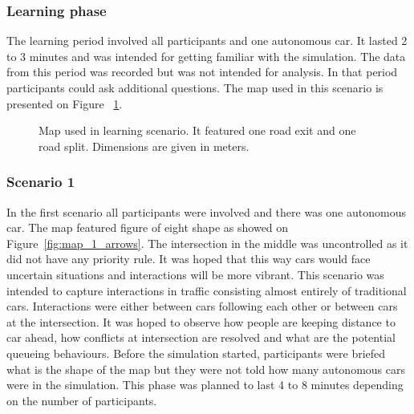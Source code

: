 \documentclass[11pt,english]{article}
\begin{document}
\subsubsection{Learning phase}


The learning period involved all participants and one autonomous car. It lasted 2 to 3 minutes and was intended for getting familiar with the simulation. The data from this period was recorded but was not intended for analysis. In that period participants could ask additional questions. The map used in this scenario is presented on Figure ~\ref{fig:map_0_arrows}.


\begin{figure}[] %
\caption{Map used in learning scenario. It featured one road exit and one road split. Dimensions are given in meters.}
\label{fig:map_0_arrows}
\end{figure}


\subsubsection{Scenario 1}

In the first scenario all participants were involved and there was one autonomous car. The map featured figure of eight shape as showed on Figure~\ref{fig:map_1_arrows}. The intersection in the middle was uncontrolled as it did not have any priority rule. It was hoped that this way cars would face uncertain situations and interactions will be more vibrant. This scenario was intended to capture interactions in traffic consisting almost entirely of traditional cars. Interactions were either between cars following each other or between cars at the intersection. It was hoped to observe how people are keeping distance to car ahead, how conflicts at intersection are resolved and what are the potential queueing behaviours. Before the simulation started, participants were briefed what is the shape of the map but they were not told how many autonomous cars were in the simulation. This phase was planned to last 4 to 8 minutes depending on the number of participants.
\end{document}
